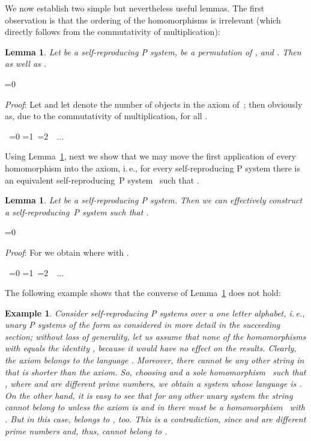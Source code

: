 \documentclass[copyright]{eptcs}
\makeatletter
\newtheorem{lemma}[theorem]{Lemma}
\newtheorem{example}[theorem]{Example\dromanb}
\newcommand*{\dromanb}{\gdef\d@tstyle{\rmfamily\upshape\mdseries}}
\newcommand{\d@tstyle}{}
\newcounter{d@proof}\let\thed@proof\relax\setcounter{d@proof}{0}
\newcommand*{\qed}{}
\newenvironment{proof}{\ifnum \value{d@proof}=0{\setcounter{claim}{0}}\else\fi
  \stepcounter{d@proof}\par\noindent
  {\rmfamily\itshape\mdseries Proof\/}:\hspace{\labelsep}\ignorespaces}{\addtocounter{d@proof}{-1}\mbox{}\nolinebreak\hfill~\ifnum \value{d@proof}=0{\qed}\else
    \ifnum \value{d@proof}=1{\qed\nolinebreak\,\nolinebreak\qed}\else
      \ifnum \value{d@proof}=2{\qed\nolinebreak\,\nolinebreak\qed
          \nolinebreak\,\nolinebreak\qed}\else
        {\qed\nolinebreak...\nolinebreak\qed}\fi\fi\fi
  \medbreak
}
\makeatother
\begin{document}
\bigskip

We now establish two simple but nevertheless useful lemmas. The first
observation is that the ordering of the homomorphisms is irrelevant (which
directly follows from the commutativity of multiplication):

\begin{lemma}
\label{homoperm}Let  be a
self-reproducing P system,  be a permutation of , and . Then  as well as .
\end{lemma}

\begin{proof}
Let  and let  denote the number of
objects  in the axiom  of~; then obviously 
as, due to the commutativity of multiplication,   for all .
\end{proof}

Using Lemma~\ref{homoperm}, next we show that we may move the first
application of every homomorphism into the axiom, i.\,e., for every
self-reproducing P system  there is an equivalent self-reproducing~P
system~ such that .

\begin{lemma}
\label{lem:plustostar}Let  be a self-reproducing P system. Then we can
effectively construct a self-reproducing~P system  such that 
.
\end{lemma}

\begin{proof}
For  we obtain
where  with .
\end{proof}

The following example shows that the converse of Lemma~\ref{lem:plustostar}
does not hold:

\begin{example}
Consider self-reproducing P systems over a one letter alphabet, i.\,e., 
\textit{unary P systems} of the form  as considered in more detail in the 
succeeding section; without loss of generality, let us assume that 
none of the homomorphisms  with  equals the
identity , because it would have no effect on the results.
Clearly, the axiom  belongs to the language . Moreover,
there cannot be any other string in  that is shorter than
the axiom. So, choosing  and a sole homomorphism~ such
that , where  and  are different prime
numbers, we obtain a system  whose language  is . On the other hand, it is easy to see
that for any other unary system  the string 
cannot belong to  unless the axiom is  and in  there must be a homomorphism~ with . But in this case,  belongs to , too. This is a contradiction, since  and  are different prime numbers and, thus,  cannot belong
\linebreak
to .\hfill
\end{example}
\end{document}
